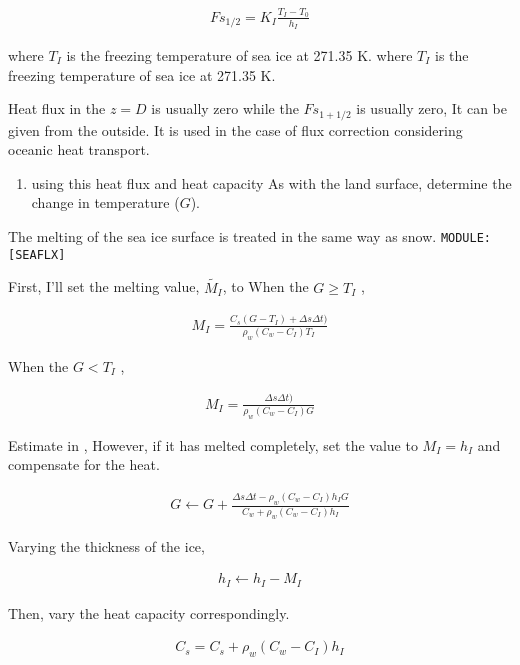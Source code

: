 \begin{eqnarray}
 Fs_{1/2} = K_I \frac{ T_I - T_0 }{h_I}
\end{eqnarray}

where \(T_I\) is the freezing temperature of sea ice at 271.35 K. where
\(T_I\) is the freezing temperature of sea ice at 271.35 K.

Heat flux in the \(z=D\) is usually zero while the \(Fs_{1+1/2}\) is
usually zero, It can be given from the outside. It is used in the case
of flux correction considering oceanic heat transport.

\begin{enumerate}
\def\labelenumi{\arabic{enumi}.}
\setcounter{enumi}{1}
\tightlist
\item
  using this heat flux and heat capacity As with the land surface,
  determine the change in temperature (\(G\)).
\end{enumerate}

The melting of the sea ice surface is treated in the same way as snow.
\texttt{MODULE:{[}SEAFLX{]}}

First, I'll set the melting value, \(\tilde{M_I}\), to When the
\(G \ge T_I\) ,

\begin{eqnarray}
  M_I
  =  \frac{C_s ( G - T_I ) + \Delta s \Delta t )}
          {\rho_w ( C_w - C_I ) T_I }
\end{eqnarray}

When the \(G < T_I\) ,

\begin{eqnarray}
  M_I
  =  \frac{\Delta s \Delta t )}
          {\rho_w ( C_w - C_I ) G}
\end{eqnarray}

Estimate in , However, if it has melted completely, set the value to
\(M_I=h_I\) and compensate for the heat.

\begin{eqnarray}
  G \leftarrow G + \frac{ \Delta s \Delta t 
                          - \rho_w ( C_w - C_I ) h_I G  }
                        { C_w + \rho_w ( C_w - C_I ) h_I}
\end{eqnarray}

Varying the thickness of the ice,

\begin{eqnarray}
  h_I \leftarrow h_I - M_I 
\end{eqnarray}

Then, vary the heat capacity correspondingly.

\begin{eqnarray}
  C_s = C_s + \rho_w ( C_w - C_I ) h_I
\end{eqnarray}

